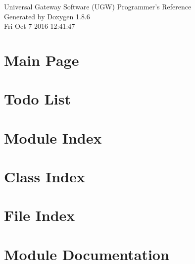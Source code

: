 \documentclass[twoside]{book}
\newcommand{\clearemptydoublepage}{%
  \newpage{\pagestyle{empty}\cleardoublepage}%
}
\begin{document}
\hypersetup{pageanchor=false}
\begin{titlepage}
\vspace*{7cm}
\begin{center}%
{\Large Universal Gateway Software (U\-G\-W) Programmer's Reference }\\
\vspace*{1cm}
{\large Generated by Doxygen 1.8.6}\\
\vspace*{0.5cm}
{\small Fri Oct 7 2016 12:41:47}\\
\end{center}
\end{titlepage}
\clearemptydoublepage
\tableofcontents
\clearemptydoublepage
{}
\hypersetup{pageanchor=true}

\chapter{Main Page}
\label{index}\hypertarget{index}{}
\chapter{Todo List}
\label{todo}
\hypertarget{todo}{}

\chapter{Module Index}

\chapter{Class Index}

\chapter{File Index}

\chapter{Module Documentation}


















\end{document}
